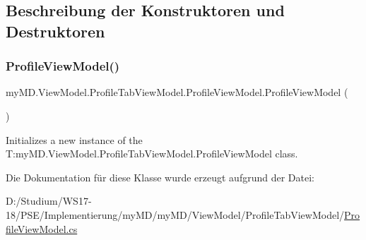 \subsection{Beschreibung der Konstruktoren und Destruktoren}
\mbox{\label{classmy_m_d_1_1_view_model_1_1_profile_tab_view_model_1_1_profile_view_model_aa7d7cd132645a689b99eccd006b51c40}} 
\subsubsection{\texorpdfstring{Profile\+View\+Model()}{ProfileViewModel()}}
{\footnotesize\ttfamily my\+M\+D.\+View\+Model.\+Profile\+Tab\+View\+Model.\+Profile\+View\+Model.\+Profile\+View\+Model (\begin{DoxyParamCaption}{ }\end{DoxyParamCaption})}



Initializes a new instance of the T\+:my\+M\+D.\+View\+Model.\+Profile\+Tab\+View\+Model.\+Profile\+View\+Model class. 



Die Dokumentation für diese Klasse wurde erzeugt aufgrund der Datei\+:\begin{DoxyCompactItemize}
\item 
D\+:/\+Studium/\+W\+S17-\/18/\+P\+S\+E/\+Implementierung/my\+M\+D/my\+M\+D/\+View\+Model/\+Profile\+Tab\+View\+Model/\mbox{\hyperlink{_profile_view_model_8cs}{Profile\+View\+Model.\+cs}}\end{DoxyCompactItemize}
